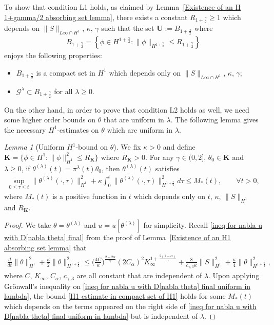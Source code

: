 \documentclass[reqno]{amsart}%
\theoremstyle{definition}
\theoremstyle{remark}
\numberwithin{equation}{section}
\newtheorem{lemma}[theorem]{Lemma}
\newcommand{\thetalambda}{\theta^{(\lambda)}}
\newcommand{\1}{\mathbf{1}}
\newcommand{\Gg}{\mathcal{G}^{\lambda}}
\newcommand{\K}{K_{\infty}}
\newcommand{\pin}{\pi^{\lambda}}
\newcommand{\U}{\mathbf{U}}
\newcommand{\Uc}{\mathbf{K}}
\numberwithin{equation}{section}
\numberwithin{theorem}{section}
\numberwithin{figure}{section}
\begin{document}
To show that condition L1 holds, as claimed by Lemma~\ref{Existence of an H 1+gamma/2 absorbing set lemma}, there exists a constant $R_{1+\frac{\gamma}{2}}\ge1$ which depends on $\|S\|_{L\infty\cap H^1}$, $\kappa$, $\gamma$ such that the set $\U:=B_{1+\frac{\gamma}{2}}$ where
\begin{align*}
B_{1+\frac{\gamma}{2}}=\left\{\phi\in H^{1+\frac{\gamma}{2}}:\|\phi\|_{H^{1+\frac{\gamma}{2}}}\le R_{1+\frac{\gamma}{2}}\right\}
\end{align*}
enjoys the following properties:
\begin{itemize}
\item $B_{1+\frac{\gamma}{2}}$ is a compact set in $H^1$ which depends only on $\|S\|_{L\infty\cap H^1}$, $\kappa$, $\gamma$;
\item $\Gg\subset B_{1+\frac{\gamma}{2}}$ for all $\lambda\ge0$.
\end{itemize}

On the other hand, in order to prove that condition L2 holds as well, we need some higher order bounds on $\theta$ that are uniform in $\lambda$. The following lemma gives the necessary $H^1$-estimates on $\theta$ which are uniform in $\lambda$.

\begin{lemma}[Uniform $H^1$-bound on $\theta$]
We fix $\kappa>0$ and define $\Uc=\{\phi\in H^1:\|\phi\|^2_{H^1}\le R_{\Uc}\}$ where $R_{\Uc}>0$. For any $\gamma\in(0,2]$, $\theta_0\in\Uc$ and $\lambda\ge0$, if $\thetalambda(t)=\pin(t)\theta_0$, then $\thetalambda(t)$ satisfies
\begin{align}\label{H1 estimate in compact set of H1}
\sup_{0\le \tau\le t}\|\thetalambda(\cdot,\tau)\|^2_{H^1}+\kappa\int_0^t\|\thetalambda(\cdot,\tau)\|_{H^{1+\frac{\gamma}{2}}}^2d\tau\le M_*(t),\qquad\forall t>0,
\end{align}
where $M_*(t)$ is a positive function in $t$ which depends only on $t$, $\kappa$, $\|S\|_{H^1}$ and $R_{\Uc}$.
\end{lemma}

\begin{proof}
We take $\theta=\thetalambda$ and $u=u[\thetalambda]$ for simplicity. Recall \eqref{ineq for nabla u with D[nabla theta] final} from the proof of Lemma~\ref{Existence of an H1 absorbing set lemma} that
\begin{align}\label{ineq for nabla u with D[nabla theta] final uniform in lambda}
\frac{d}{dt}\|\theta\|^2_{H^1}+\frac{\kappa}{2}\|\theta\|^2_{H^{1+\frac{\gamma}{2}}}
\le\Big(\frac{4C}{\kappa}\Big)^\frac{2-2\alpha}{\gamma}(2C_\alpha)^2\K^{1+\frac{2(1-\alpha)}{\gamma}}+\frac{8}{c_{\gamma,3}\kappa}\|S\|^2_{H^1}+\frac{\kappa}{4}\|\theta\|^2_{H^{1+\frac{\gamma}{2}}},
\end{align}
where $C$, $K_\infty$, $C_\alpha$, $c_{\gamma,3}$ are all constant that are independent of $\lambda$. Upon applying Gr\"{o}nwall's inequality on \eqref{ineq for nabla u with D[nabla theta] final uniform in lambda}, the bound \eqref{H1 estimate in compact set of H1} holds for some $M_*(t)$ which depends on the terms appeared on the right side of \eqref{ineq for nabla u with D[nabla theta] final uniform in lambda} but is independent of $\lambda$. 
\end{proof}
\end{document}
